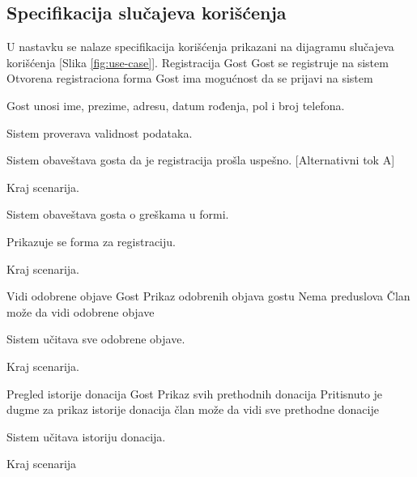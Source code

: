 \subsection{Specifikacija slučajeva korišćenja}
\par U nastavku se nalaze specifikacija korišćenja prikazani na dijagramu slučajeva korišćenja [Slika \ref{fig:use-case}].
        {Registracija}
        {Gost}
        {Gost se registruje na sistem}
        {Otvorena registraciona forma}
        {Gost ima mogućnost da se prijavi na sistem}
        {
            \item Gost unosi ime, prezime, adresu, datum rođenja, pol i broj telefona.
            \item Sistem proverava validnost podataka.
            \item Sistem obaveštava gosta da je registracija prošla uspešno. [Alternativni tok A]
            \item Kraj scenarija.
        }
        {
            {
                \item Sistem obaveštava gosta o greškama u formi.
                \item Prikazuje se forma za registraciju.
                \item Kraj scenarija.
            }
        }
          {Vidi odobrene objave}
          {Gost}
          {Prikaz odobrenih objava gostu}
          {Nema preduslova}
          {Član može da vidi odobrene objave}
          {
            \item Sistem učitava sve odobrene objave.
            \item Kraj scenarija.
          }
          {}

         {Pregled istorije donacija}
         {Gost}
         {Prikaz svih prethodnih donacija}
         {Pritisnuto je dugme za prikaz istorije donacija}
         {član može da vidi sve prethodne donacije}
         {
            \item Sistem učitava istoriju donacija.
            \item Kraj scenarija
         }
         {}


